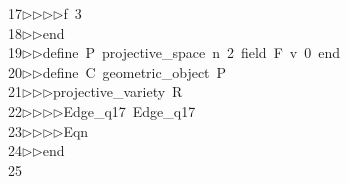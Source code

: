 \begin{tabbing}
17\>$\triangleright$\>$\triangleright$\>$\triangleright$\>$\triangleright$\>f\ 3\ \\[0pt]
18\>$\triangleright$\>$\triangleright$\>end\ \\[0pt]
19\>$\triangleright$\>$\triangleright$\>define\ P\ projective\_space\ n\ 2\ field\ F\ v\ 0\ end\ \\[0pt]
20\>$\triangleright$\>$\triangleright$\>define\ C\ geometric\_object\ P\ \\[0pt]
21\>$\triangleright$\>$\triangleright$\>$\triangleright$\>projective\_variety\ R\ \\[0pt]
22\>$\triangleright$\>$\triangleright$\>$\triangleright$\>$\triangleright$\>Edge\_q17\ Edge\_q17\ \\[0pt]
23\>$\triangleright$\>$\triangleright$\>$\triangleright$\>$\triangleright$\>Eqn\ \\[0pt]
24\>$\triangleright$\>$\triangleright$\>end\\[0pt]
25\>\end{tabbing}
